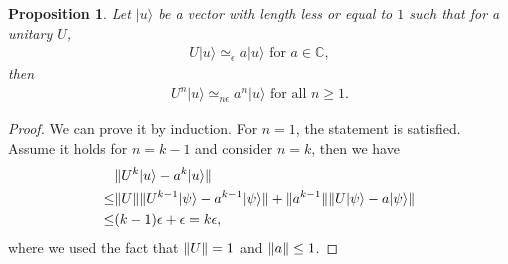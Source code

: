 \documentclass[11pt,letterpaper]{article}
\newcommand{\ket}[1]{|#1\rangle}
\DeclarePairedDelimiter{\norm}{\lVert}{\rVert}
\newcommand{\C}{\mathbb{C}}
\newcommand{\1}{\mathbb{1}}
\newcommand{\ep}{\epsilon}
\newcommand{\appd}[1]{\simeq_{#1}}
\newtheorem{proposition}[theorem]{Proposition}
\theoremstyle{definition}
\begin{document}
\begin{proposition}
	Let $\ket{u}$ be a vector with length less or equal to $1$ such that for a unitary $U$,
	\begin{align}
		U\ket{u} \appd{\ep} a\ket{u} \text{ for } a \in \C,
	\end{align}
	then
	\begin{align}
		U^n \ket{u} \appd{n\ep} a^n \ket{u} \text{ for all } n \geq 1.
	\end{align}
\end{proposition}
\begin{proof}
	We can prove it by induction. 
	For $n=1$, the statement is satisfied.
	Assume it holds for $n = k-1$ and consider $n = k$, then we have
	\begin{align}
		&\norm{U^k \ket{u} - a^k\ket{u}} \\
		\leq &\norm{U} \norm{U^{k-1} \ket{\psi} - a^{k-1}\ket{\psi}} + \norm{a^{k-1}}
		\norm{U\ket{\psi} - a \ket{\psi}}\\
		\leq &(k-1)\ep + \ep = k \ep,
	\end{align}
	where we used the fact that $\norm{U} = 1$ and $\norm{a} \leq 1$.
\end{proof}
\end{document}
